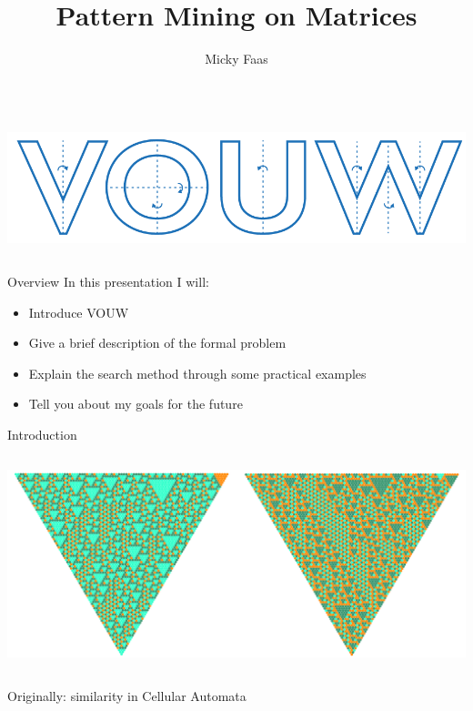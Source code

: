 \documentclass[11pt]{beamer}
\author{Micky Faas}
\title{Pattern Mining on Matrices}
\begin{document}
\beamertemplatenavigationsymbolsempty
\begin{frame}
\nointerlineskip%
\begin{columns}
\column{\dimexpr\paperwidth}
\centering %


\includegraphics[width=0.4\paperwidth]{"VOUW logo-02"} 
\maketitle
\end{columns}
\end{frame}


\begin{frame}{Overview}
In this presentation I will:
\begin{itemize}
\item Introduce VOUW
\item Give a brief description of the formal problem
\item Explain the search method through some practical examples
\item Tell you about my goals for the future
\end{itemize}
\end{frame}


\begin{frame}{Introduction}
\nointerlineskip%
\begin{columns}
\column{\dimexpr\paperwidth}
\centering
\includegraphics[width=\paperwidth]{"rf-automaton"} 
\end{columns}
\medskip
Originally: similarity in Cellular Automata
\end{frame}
\end{document}
